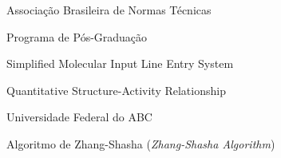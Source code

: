 \begin{siglas}
	\item[ABNT] Associação Brasileira de Normas Técnicas
	\item[PPG] Programa de Pós-Graduação
	\item[SMILES] Simplified Molecular Input Line Entry System
	\item[QSAR] Quantitative Structure-Activity Relationship
	\item[UFABC] Universidade Federal do ABC
	\item[ZSA] Algoritmo de Zhang-Shasha (\emph{Zhang-Shasha Algorithm})
\end{siglas}
